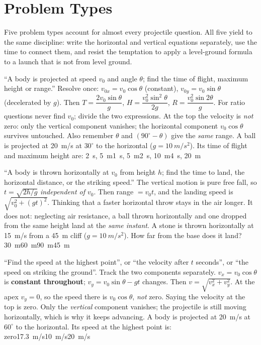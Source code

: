 \section{Problem Types}\label{sec:types4}
Five problem types account for almost every projectile question. All five yield to the same discipline:
write the horizontal and vertical equations separately, use the time to connect them, and resist the
temptation to apply a level-ground formula to a launch that is not from level ground.

{``A body is projected at speed $v_0$ and angle $\theta$; find the time of flight, maximum height or
range.''}
{Resolve once: $v_{0x}=v_0\cos\theta$ (constant), $v_{0y}=v_0\sin\theta$ (decelerated by $g$). Then
$T=\dfrac{2v_0\sin\theta}{g}$, $H=\dfrac{v_0^2\sin^2\theta}{2g}$, $R=\dfrac{v_0^2\sin2\theta}{g}$. For ratio
questions never find $v_0$; divide the two expressions.}
{At the top the velocity is \emph{not} zero: only the vertical component vanishes; the horizontal
component $v_0\cos\theta$ survives untouched. Also remember $\theta$ and $(90^\circ-\theta)$ give the
\emph{same} range.}
{A ball is projected at \SI{20}{m/s} at $30^\circ$ to the horizontal ($g=\SI{10}{m/s^2}$). Its time of flight and
maximum height are:}
{\SI{2}{s}, \SI{5}{m}}{\SI{1}{s}, \SI{5}{m}}{\SI{2}{s}, \SI{10}{m}}{\SI{4}{s}, \SI{20}{m}}

{``A body is thrown horizontally at $v_0$ from height $h$; find the time to land, the horizontal
distance, or the striking speed.''}
{The vertical motion is pure free fall, so $t=\sqrt{2h/g}$ \emph{independent of $v_0$}. Then
range $=v_0t$, and the landing speed is $\sqrt{v_0^2+(gt)^2}$.}
{Thinking that a faster horizontal throw stays in the air longer. It does not: neglecting air
resistance, a ball thrown horizontally and one dropped from the same height land at the \emph{same
instant}.}
{A stone is thrown horizontally at \SI{15}{m/s} from a \SI{45}{m} cliff ($g=\SI{10}{m/s^2}$). How far from the base
does it land?}
{\SI{30}{m}}{\SI{60}{m}}{\SI{90}{m}}{\SI{45}{m}}

{``Find the speed at the highest point'', or ``the velocity after $t$ seconds'', or ``the speed on
striking the ground''.}
{Track the two components separately. $v_x=v_0\cos\theta$ is \textbf{constant throughout};
$v_y=v_0\sin\theta-gt$ changes. Then $v=\sqrt{v_x^2+v_y^2}$. At the apex $v_y=0$, so the speed there is
$v_0\cos\theta$, \emph{not} zero.}
{Saying the velocity at the top is zero. Only the \emph{vertical} component vanishes; the projectile is
still moving horizontally, which is why it keeps advancing.}
{A body is projected at \SI{20}{m/s} at $60^\circ$ to the horizontal. Its speed at the highest point is:}
{zero}{\SI{17.3}{m/s}}{\SI{10}{m/s}}{\SI{20}{m/s}}

